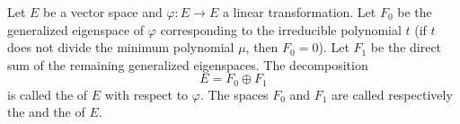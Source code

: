 Let $E$ be a vector space and $\varphi: E \to E$ a linear transformation. Let $F_0$ be the generalized eigenspace of $\varphi$ corresponding to the irreducible polynomial $t$ (if $t$ does not divide the minimum polynomial $\mu$, then $F_0 = 0$). Let $F_1$ be the direct sum of the remaining generalized eigenspaces. The decomposition
$$E = F_0 \oplus F_1$$
is called the  of $E$ with respect to $\varphi$. The spaces $F_0$ and $F_1$ are called respectively the  and the  of $E$.
